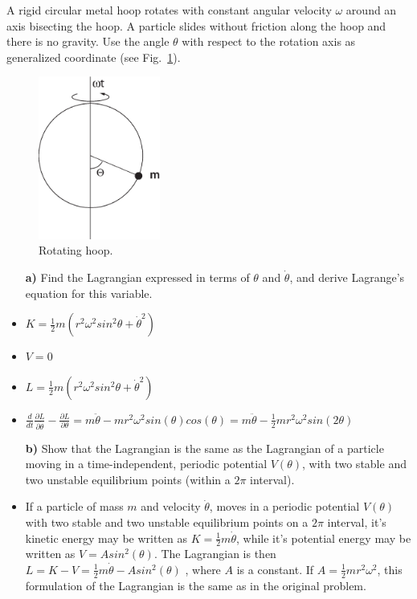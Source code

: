 \documentclass[11pt,a4paper]{report}
\newcounter{excount}[chapter]
\newenvironment{exercise}[1][]{\addtocounter{excount}{1} \noindent {\bf Problem
    \arabic{excount} \ \ #1}\hspace{2mm}}{\vspace{4mm}}
\begin{document}
\begin{exercise}
A rigid circular metal hoop rotates with constant angular velocity $\omega$ around an axis bisecting the hoop. A particle slides without friction along the hoop and there is no gravity. Use the angle $\theta$ with respect to the rotation axis as generalized coordinate (see Fig.~\ref{fig:hoop}).

\begin{figure}[h!]
\begin{center}
\includegraphics[width=4cm]{RotatingHoop.eps}
\end{center}
\caption{Rotating hoop.}
\label{fig:hoop}
\end{figure}

\begin{itemize}
\item[\bf a)] Find the Lagrangian expressed in terms of $\theta$ and $\dot\theta$, and derive Lagrange's equation for this variable.

\item $K=\frac{1}{2}m(r^2\omega^2 sin^2\theta+\dot{\theta}^2)$
\item $V=0$
\item $L=\frac{1}{2}m(r^2\omega^2 sin^2\theta+\dot{\theta}^2)$
\item $\frac{d}{dt}\frac{\partial L}{\partial \dot{\theta}}-\frac{\partial L}{\partial \theta}=
m\ddot{\theta}-m r^2\omega^2 sin(\theta)cos(\theta)=m\ddot{\theta}-\frac{1}{2} m r^2\omega^2 sin(2\theta)$

\item[\bf b)] Show that the Lagrangian is the same as the Lagrangian of a particle moving in a time-independent, periodic potential $V(\theta)$, with two stable and two unstable equilibrium points (within a $2\pi$ interval).

\item If a particle of mass $m$ and velocity $\dot{\theta}$, moves in a periodic potential $V(\theta)$ with two stable and two unstable equilibrium points on a $2\pi$ interval, it's kinetic energy may be written as $K=\frac{1}{2}m\dot{\theta}$, while it's potential energy may be written as $V=Asin^2(\theta)$. The Lagrangian is then $L=K-V=\frac{1}{2}m\dot{\theta}-Asin^2(\theta)$  , where $A$ is a constant. If $A=\frac{1}{2} m r^2\omega^2 $, this formulation of the Lagrangian is the same as in the original problem.


\end{itemize}
\end{exercise}
\end{document}
